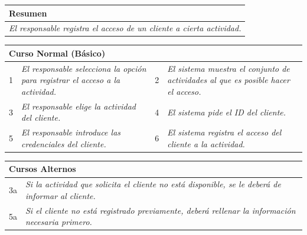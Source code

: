         \begin{table}[H]
        \begin{tabular}{llllllll}
        \hline
        \multicolumn{8}{|l|}{\cellcolor[HTML]{F2F2F2}Resumen} \\ \hline
        \multicolumn{8}{|p{15cm}|}{{\color[HTML]{808080} \textit{El responsable registra el acceso de un cliente a cierta actividad.}}} \\ \hline
        \end{tabular}
        \end{table}
        
        \begin{table}[H]
        \begin{tabular}{llllllll}
        \hline
        \multicolumn{8}{|l|}{\cellcolor[HTML]{F2F2F2}Curso Normal (Básico)} \\ \hline
        \multicolumn{1}{|c|}{1} & \multicolumn{1}{p{6cm}|}{{\color[HTML]{808080} \textit{El responsable selecciona la opción para registrar el acceso a la actividad.}}} & \multicolumn{1}{c|}{2} & \multicolumn{5}{p{6cm}|}{{\color[HTML]{808080} \textit{El sistema muestra el conjunto de actividades al que es posible hacer el acceso.}}} \\ \hline
        \multicolumn{1}{|c|}{3} & \multicolumn{1}{p{6cm}|}{{\color[HTML]{808080} \textit{El responsable elige la actividad del cliente.}}} & \multicolumn{1}{c|}{4} & \multicolumn{5}{p{6cm}|}{{\color[HTML]{808080} \textit{El sistema pide el ID del cliente.}}} \\ \hline
        \multicolumn{1}{|c|}{5} & \multicolumn{1}{p{6cm}|}{{\color[HTML]{808080} \textit{El responsable introduce las credenciales del cliente.}}} & \multicolumn{1}{c|}{6} & \multicolumn{5}{p{6cm}|}{{\color[HTML]{808080} \textit{El sistema registra el acceso del cliente a la actividad.}}} \\ \hline
        \end{tabular}
        \end{table}
        
        \begin{table}[H]
        \begin{tabular}{llllllll}
        \hline
        \multicolumn{8}{|l|}{\cellcolor[HTML]{F2F2F2}Cursos Alternos} \\ \hline
        \multicolumn{1}{|c|}{3a} & \multicolumn{7}{p{14cm}|}{{\color[HTML]{808080} \textit{Si la actividad que solicita el cliente no está disponible, se le deberá de informar al cliente.}}} \\ \hline
        \multicolumn{1}{|c|}{5a} & \multicolumn{7}{p{14cm}|}{{\color[HTML]{808080} \textit{Si el cliente no está registrado previamente, deberá rellenar la información necesaria primero.}}} \\ \hline
        \end{tabular}
        \end{table}
        
